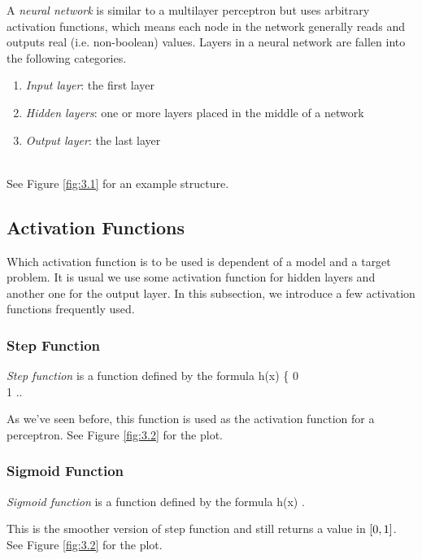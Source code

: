 \documentclass{article}
\theoremstyle{definition}
\newcommand{\fig}[1]{Figure \ref{fig:#1}}
\begin{document}
A {\it neural network} is similar to a multilayer perceptron but uses arbitrary activation functions, which means each node in the network generally reads and outputs real (i.e. non-boolean) values. Layers in a neural network are fallen into the following categories.
\begin{enumerate}
\item {\it Input layer}: the first layer
\item {\it Hidden layers}: one or more layers placed in the middle of a network
\item {\it Output layer}: the last layer
\end{enumerate}

\ \\[-3mm]\indent
See \fig{3.1} for an example structure.

\subsection{Activation Functions}

Which activation function is to be used is dependent of a model and a target problem. It is usual we use some activation function for hidden layers and another one for the output layer. In this subsection, we introduce a few activation functions frequently used.

\subsubsection{Step Function}

{\it Step function} is a function defined by the formula
\begineq
h(x) \equiv \left\{  0  \\ 1  \edarray \right.. 
\edeq

As we've seen before, this function is used as the activation function for a perceptron. See \fig{3.2} for the plot.

\subsubsection{Sigmoid Function} \label{section:3.2.2}

{\it Sigmoid function} is a function defined by the formula
\begineq
h(x) \equiv {} . 
\edeq

This is the smoother version of step function and still returns a value in $\left[ 0, 1 \right]$. See \fig{3.2} for the plot.
\end{document}
